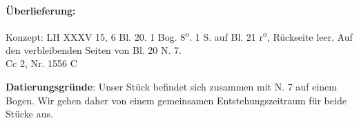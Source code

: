    
        
        \begin{ledgroupsized}[r]{120mm}
        \footnotesize 
        \pstart        
        \noindent\textbf{\"{U}berlieferung:}  
        \pend
        \end{ledgroupsized}
      
       
              \begin{ledgroupsized}[r]{114mm}
              \footnotesize 
              \pstart \parindent -6mm
              Konzept: LH XXXV 15, 6 Bl. 20. 1 Bog. 8\textsuperscript{o}. 1 S. auf Bl. 21 r\textsuperscript{o}, R\"{u}ckseite leer. Auf den verbleibenden Seiten von Bl. 20 N. 7. \\Cc 2, Nr. 1556 C \pend
              \end{ledgroupsized}
              
        \vspace*{5mm}
        \begin{ledgroup}
        \footnotesize 
        \pstart
      \noindent\footnotesize{\textbf{Datierungsgr\"{u}nde}: Unser St\"{u}ck befindet sich zusammen mit N. 7 auf einem Bogen. Wir gehen daher von einem gemeinsamen Entstehungszeitraum f\"{u}r beide St\"{u}cke aus.}
        \pend
        \end{ledgroup}
      
